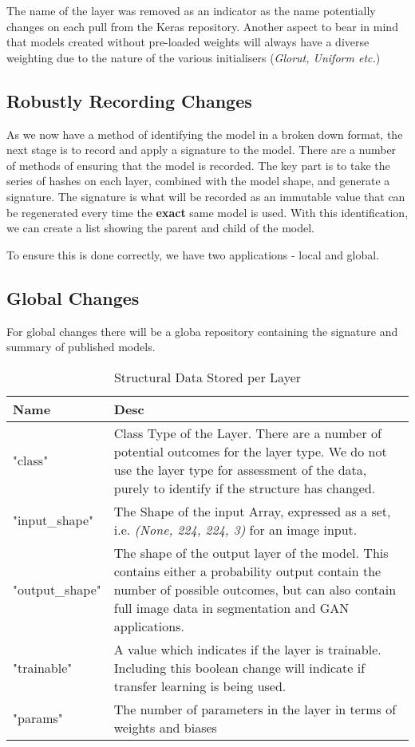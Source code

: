 The name of the layer was removed as an indicator as the name potentially changes on each pull from the Keras repository. Another aspect to bear in mind that models created without pre-loaded weights will always have a diverse weighting due to the nature of the various initialisers (\textit{Glorut, Uniform etc.})

\subsection{Robustly Recording Changes}
As we now have a method of identifying the model in a broken down format, the next stage is to record and apply a signature to the model. There are a number of methods of ensuring that the model is recorded. The key part is to take the series of hashes on each layer, combined with the model shape, and generate a signature. The signature is what will be recorded as an immutable value that can be regenerated every time the \textbf{exact} same model is used. With this identification, we can create a list showing the parent and child of the model.

To ensure this is done correctly, we have two applications - local and global.
\subsection{Global Changes}
For global changes there will be a globa repository containing the signature and summary of published models. 

\begin{table}[!ht]
    \centering
    \caption{Structural Data Stored per Layer}
    \setlength\tabcolsep{0pt} %
    \begin{tabular}{@{} p{2cm} p{6.5cm}  @{}}
            \hline
            Name & Desc \\
            \hline
            "class" & Class Type of the Layer. There are a number of potential outcomes for the layer type. We do not use the layer type for assessment of the data, purely to identify if the structure has changed. \\
            "input\_shape" & The Shape of the input Array, expressed as a set, i.e. \textit{(None, 224, 224, 3)} for an image input. \\
            "output\_shape" &  The shape of the output layer of the model. This contains either a probability output contain the number of possible outcomes, but can also contain full image data in segmentation and GAN applications. \\
            "trainable" &  A value which indicates if the layer is trainable. Including this boolean change will indicate if transfer learning is being used. \\
            "params" &  The number of parameters in the layer in terms of weights and biases \\
            \hline
    \end{tabular}
\end{table}

